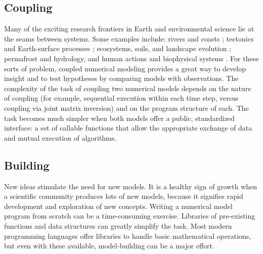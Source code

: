 \documentclass{article} %
\begin{document}
\subsection{Coupling}

Many of the exciting research frontiers in Earth and environmental science lie at the seams between systems. Some examples include: rivers and coasts \citep[e.g.,][]{ratliff2018exploring}; tectonics and Earth-surface processes \citep[e.g.,][]{roy2016dynamic}; ecosystems, soils, and landscape evolution \citep[e.g.,][]{istanbulluoglu2005vegetation,pelletier2017way,lyons2020speciesevolver}; permafrost and hydrology, and human actions and biophysical systems \citep[e.g.,][]{robinson2018modelling}. For these sorts of problem, coupled numerical modeling provides a great way to develop insight and to test hypotheses by comparing models with observations. The complexity of the task of coupling two numerical models depends on the nature of coupling (for example, sequential execution within each time step, versus coupling via joint matrix inversion) and on the program structure of each. The task becomes much simpler when both models offer a public, standardized interface: a set of callable functions that allow the appropriate exchange of data and mutual execution of algorithms.

\subsection{Building}\label{sec:build}

New ideas stimulate the need for new models. It is a healthy sign of growth when a scientific community produces lots of new models, because it signifies rapid development and exploration of new concepts. Writing a numerical model program from scratch can be a time-consuming exercise. Libraries of pre-existing functions and data structures can greatly simplify the task. Most modern programming languages offer libraries to handle basic mathematical operations, but even with these available, model-building can be a major effort. 
\end{document}
